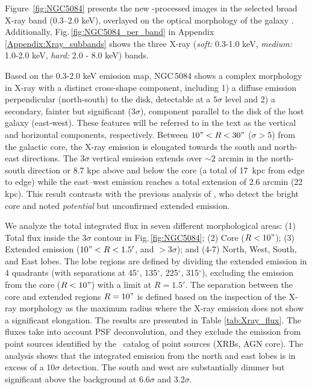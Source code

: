 \documentclass[modern]{CORE-AAS/aastex631}
\begin{document}
Figure \,\ref{fig:NGC5084} presents the new \SAUNAS-processed images in the selected broad X-ray band (0.3--2.0 keV), overlayed on the optical morphology of the galaxy \citep[large FOV optical and near-infrared $gri$ image from Pan-STARRS, ][]{chambers+2016arXiv1612.05560}. Additionally, Fig.\,\ref{fig:NGC5084_per_band} in Appendix \ref{Appendix:Xray_subbands} shows the three X-ray (\emph{soft:} 0.3-1.0 keV, \emph{medium:} 1.0-2.0 keV, \emph{hard:} 2.0 - 8.0 keV) bands. \par 

Based on the 0.3-2.0 keV emission map, NGC\,5084 shows a complex morphology in X-ray with a distinct cross-shape component, including 1) a diffuse emission perpendicular (north-south) to the disk, detectable at a $5\sigma$ level and 2) a secondary, fainter but significant ($3\sigma$), component parallel to the disk of the host galaxy (east-west). These features will be referred to in the text as the vertical and horizontal components, respectively. Between $10"<R<30"$ ($\sigma>5$) from the galactic core, the X-ray emission is elongated towards the south and north-east directions. The $3\sigma$ vertical emission extends over $\sim2$ arcmin in the north-south direction or 8.7 kpc above and below the core (a total of 17~kpc from edge to edge) while the east--west emission reaches a total extension of 2.6 arcmin (22 kpc). This result contrasts with the previous analysis of \citet{osullivan+2017mnras472_1482}, who detect the bright core and noted \emph{potential} but unconfirmed extended emission.

We analyze the total integrated flux in seven different morphological areas: (1) Total %
flux inside the $3\sigma$ contour in Fig.\,\ref{fig:NGC5084}; (2) Core ($R<10"$); (3) Extended emission ($10"<R<1.5'$, and $>3\sigma$); and (4-7) North, West, South, and East lobes. The lobe regions are defined by dividing the extended emission in 4 quadrants (with separations at 45$^{\circ}$, 135$^{\circ}$, 225$^{\circ}$, 315$^{\circ}$), excluding the emission from the core ($R<10"$) with a limit at $R=1.5'$. The separation between the core and extended regions $R=10"$ is defined based on the inspection of the X-ray morphology as the maximum radius where the X-ray emission does not show a significant elongation. The results are presented in Table \ref{tab:Xray_flux}. The fluxes take into account PSF deconvolution, and they exclude the emission from point sources identified by the \Chandra\ catalog of point sources (XRBs, AGN core). The analysis shows that the integrated emission from the north and east lobes is in excess of a 10$\sigma$ detection. The south and west are substantially dimmer but significant above the background at 6.6$\sigma$ and 3.2$\sigma$. 
\end{document}
